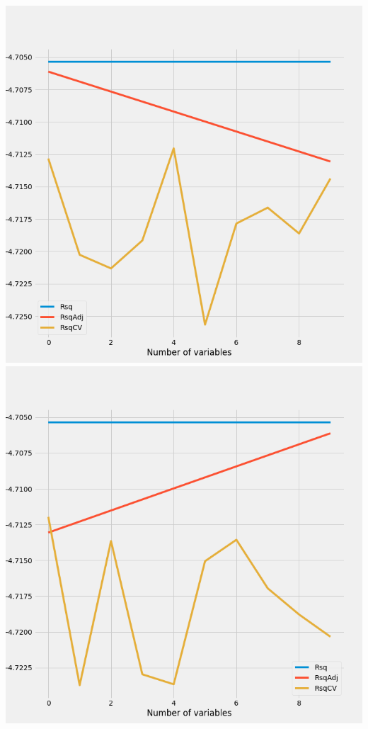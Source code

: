 \documentclass{article}
\begin{document}
	\includegraphics[scale = 0.2]{../plots/python/AutoForwardPCP.png} 
	\includegraphics[scale = 0.2]{../plots/python/BackwardPCP.png}
\end{document}
